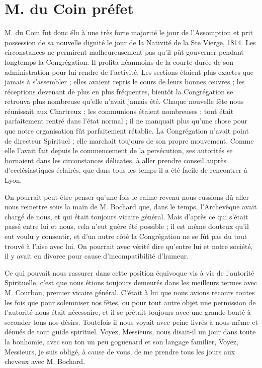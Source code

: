 \section*{M. du Coin préfet}
M. du Coin fut donc élu à une très forte majorité le jour de l'Assomption et prit possession de sa nouvelle dignité le jour de la Nativité de la Ste Vierge, 1814. Les circonstances ne permirent malheureusement pas qu'il pût gouverner pendant
longtemps la Congrégation. Il profita néanmoins de la courte durée de son administration pour lui rendre de l'activité. Les sections étaient plus exactes que jamais à s'assembler ; elles avaient repris le cours de leurs bonnes œuvres ; les réceptions devenant de plus en plus fréquentes, bientôt la Congrégation se retrouva plus nombreuse qu'elle n'avait jamais été. Chaque nouvelle fête nous réunissait aux Chartreux ; les communions étaient nombreuses ; tout était parfaitement rentré dans l'état normal ; il ne manquait plus qu'une chose pour que notre organisation fût parfaitement rétablie. La Congrégation n'avait point de directeur Spirituel ; elle marchait toujours de son propre mouvement. Comme elle l'avait fait depuis le commencement de la persécution, ses autorités se bornaient dans les circonstances délicates, à aller prendre conseil auprès d'ecclésiastiques éclairés, que dans tous les temps il a été facile de rencontrer à Lyon.

On pourrait peut-être penser qu'une fois le calme revenu nous eussions dû aller nous remettre sous la main de M. Bochard que, dans le temps, l'Archevêque avait chargé de nous, et qui était toujours vicaire général. Mais d'après ce qui s'était passé entre lui et nous, cela n'eut guère été possible ; il est même douteux qu'il eut voulu y consentir, et d'un autre côté la Congrégation ne se fût pas du tout trouvé à l'aise avec lui. On pourrait avec vérité dire qu'entre lui et notre société, il y avait eu divorce pour cause d'incompatibilité d'humeur.

Ce qui pouvait nous rassurer dans cette position équivoque vis à vis de l'autorité Spirituelle, c'est que nous
étions toujours demeurés dans les meilleurs termes avec M. Courbon, premier vicaire général. C'était à lui que nous avions recours toutes les fois que pour solemniser nos fêtes, ou pour tout autre objet une permission de l'autorité nous était nécessaire, et il se prêtait toujours avec une grande bonté à seconder tous nos désirs. Toutefois il nous voyait avec peine livrés à nous-même et dénués de tout guide spirituel. Voyez, Messieurs, nous disait-il un jour dans toute la bonhomie, avec son ton un peu goguenard et son langage familier, Voyez, Messieurs, je suis obligé, à cause de vous, de me prendre tous les jours aux cheveux avec M. Bochard.

